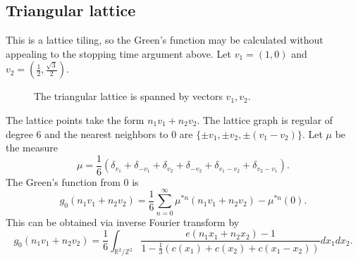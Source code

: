 \documentclass[a4paper, 12pt, notitlepage]{amsart}
\newcommand{\bR}{\mathbb{R}}
\newcommand{\zed}{\mathbb{Z}}
\theoremstyle{remark}
\begin{document}
\subsection{Triangular lattice} This is a lattice tiling, so the Green's function may be calculated without appealing to the stopping time argument above.  Let $v_1 = (1,0)$ and $v_2 = \left(\frac{1}{2}, \frac{\sqrt{3}}{2}\right)$.
\begin{figure}\centering
   \caption{The triangular lattice is spanned by vectors $v_1, v_2$.}\label{fig:triangular_lattice}
\end{figure}
The lattice points take the form $n_1 v_1 + n_2 v_2$.  The lattice graph is regular of degree 6 and the nearest neighbors to 0 are $\{\pm v_1, \pm v_2, \pm (v_1 - v_2)\}$.
Let $\mu$ be the measure
\begin{equation}
 \mu = \frac{1}{6}\left(\delta_{v_1} + \delta_{-v_1} + \delta_{v_2} + \delta_{-v_2} + \delta_{v_1-v_2} + \delta_{v_2-v_1}\right).
\end{equation}
The Green's function from 0 is
\begin{equation}
 g_0(n_1 v_1 + n_2 v_2) = \frac{1}{6}\sum_{n=0}^\infty \mu^{*n}(n_1v_1 +n_2v_2) - \mu^{*n}(0).
\end{equation}
This can be obtained via inverse Fourier transform by
\begin{equation}
 g_0(n_1 v_1 + n_2 v_2) = \frac{1}{6}\int_{\bR^2/\zed^2} \frac{e(n_1 x_1 + n_2x_2)-1}{1 - \frac{1}{3}\left(c(x_1) + c(x_2) + c(x_1-x_2) \right)} dx_1 dx_2.
\end{equation}
\end{document}
